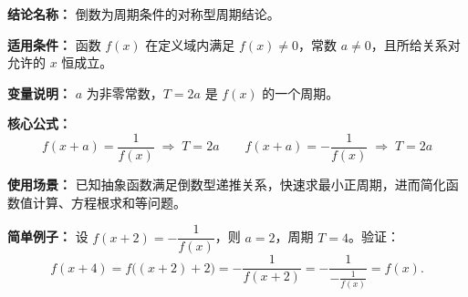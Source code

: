 \textbf{结论名称：} 倒数为周期条件的对称型周期结论。

\textbf{适用条件：} 函数 \(f(x)\) 在定义域内满足 \(f(x)\neq 0\)，常数 \(a\neq 0\)，且所给关系对允许的 \(x\) 恒成立。

\textbf{变量说明：} \(a\) 为非零常数，\(T=2a\) 是 \(f(x)\) 的一个周期。

\textbf{核心公式：}
\[
\boxed{f(x+a)=\frac{1}{f(x)} \;\Longrightarrow\; T=2a}
\qquad
\boxed{f(x+a)=-\frac{1}{f(x)} \;\Longrightarrow\; T=2a}
\]

\textbf{使用场景：} 已知抽象函数满足倒数型递推关系，快速求最小正周期，进而简化函数值计算、方程根求和等问题。

\textbf{简单例子：} 设 \(f(x+2)=-\dfrac{1}{f(x)}\)，则 \(a=2\)，周期 \(T=4\)。验证：
\[
f(x+4)=f\big((x+2)+2\big)=-\frac{1}{f(x+2)}=-\frac{1}{-\frac{1}{f(x)}}=f(x).
\]